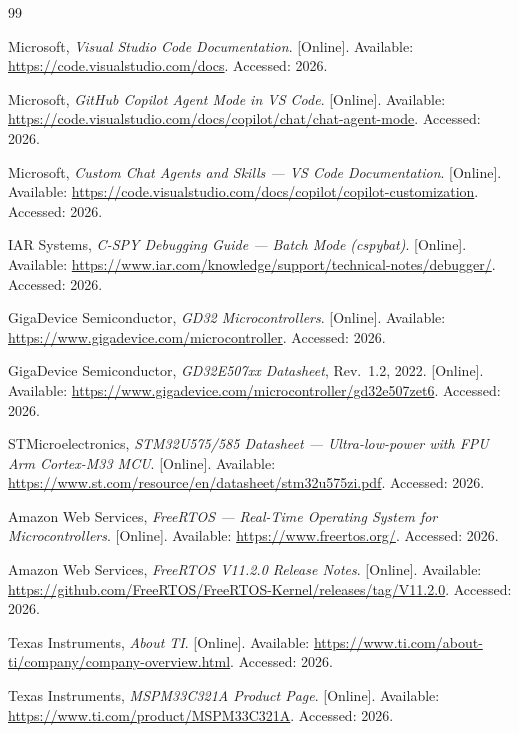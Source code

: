 \documentclass[12pt,a4paper,oneside]{book}
\begin{document}
\begin{thebibliography}{99}

Microsoft, \emph{Visual Studio Code Documentation}. [Online]. Available: \url{https://code.visualstudio.com/docs}. Accessed: 2026.

Microsoft, \emph{GitHub Copilot Agent Mode in VS Code}. [Online]. Available: \url{https://code.visualstudio.com/docs/copilot/chat/chat-agent-mode}. Accessed: 2026.

Microsoft, \emph{Custom Chat Agents and Skills --- VS Code Documentation}. [Online]. Available: \url{https://code.visualstudio.com/docs/copilot/copilot-customization}. Accessed: 2026.

IAR Systems, \emph{C-SPY Debugging Guide --- Batch Mode (cspybat)}. [Online]. Available: \url{https://www.iar.com/knowledge/support/technical-notes/debugger/}. Accessed: 2026.


GigaDevice Semiconductor, \emph{GD32 Microcontrollers}. [Online]. Available: \url{https://www.gigadevice.com/microcontroller}. Accessed: 2026.

GigaDevice Semiconductor, \emph{GD32E507xx Datasheet}, Rev.~1.2, 2022. [Online]. Available: \url{https://www.gigadevice.com/microcontroller/gd32e507zet6}. Accessed: 2026.

STMicroelectronics, \emph{STM32U575/585 Datasheet --- Ultra-low-power with FPU Arm Cortex-M33 MCU}. [Online]. Available: \url{https://www.st.com/resource/en/datasheet/stm32u575zi.pdf}. Accessed: 2026.

Amazon Web Services, \emph{FreeRTOS --- Real-Time Operating System for Microcontrollers}. [Online]. Available: \url{https://www.freertos.org/}. Accessed: 2026.

Amazon Web Services, \emph{FreeRTOS V11.2.0 Release Notes}. [Online]. Available: \url{https://github.com/FreeRTOS/FreeRTOS-Kernel/releases/tag/V11.2.0}. Accessed: 2026.


Texas Instruments, \emph{About TI}. [Online]. Available: \url{https://www.ti.com/about-ti/company/company-overview.html}. Accessed: 2026.

Texas Instruments, \emph{MSPM33C321A Product Page}. [Online]. Available: \url{https://www.ti.com/product/MSPM33C321A}. Accessed: 2026.


\end{thebibliography}
\end{document}
